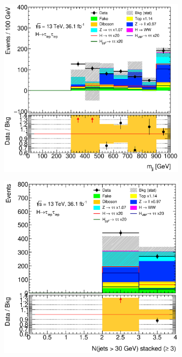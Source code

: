 \begin{figure}[htb]
\begin{subfigure}[t]{0.3\textwidth}
    \end{subfigure}
    \begin{subfigure}[t]{0.3\textwidth}
        \includegraphics[width=\textwidth]{./plots/mva/modeling/input_vars/VBF_SF/ll-CutMVAVBFCatSF-Mjj-lin.eps}
    \end{subfigure}
    \begin{subfigure}[t]{0.3\textwidth}
        \includegraphics[width=\textwidth]{./plots/mva/modeling/input_vars/VBF_SF/ll-CutMVAVBFCatSF-nJets30Stacked3-lin.eps}

\end{subfigure}
\end{figure}
